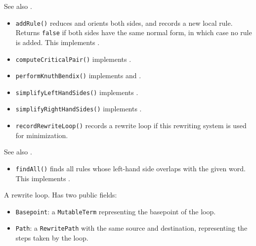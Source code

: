 \documentclass[../generics]{subfiles}
\begin{document}
See also .
\begin{itemize}
\item \texttt{addRule()} reduces and orients both sides, and records a new local rule. Returns \texttt{false} if both sides have the same normal form, in which case no rule is added. This implements .
\item {}\texttt{computeCriticalPair()} implements .
\item {}\texttt{performKnuthBendix()} implements  and .
\item \texttt{simplifyLeftHandSides()} implements .
\item \texttt{simplifyRightHandSides()} implements .
\item \texttt{recordRewriteLoop()} records a rewrite loop if this rewriting system is used for minimization.
\end{itemize}

See also .
\begin{itemize}
\item \texttt{findAll()} finds all rules whose left-hand side overlaps with the given word. This implements .
\end{itemize}

A rewrite loop. Has two public fields:
\begin{itemize}
\item \texttt{Basepoint}: a \texttt{MutableTerm} representing the basepoint of the loop.
\item \texttt{Path}: a \texttt{RewritePath} with the same source and destination, representing the steps taken by the loop.
\end{itemize}
\end{document}
